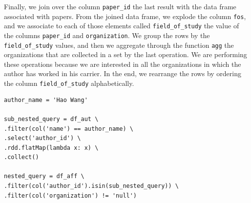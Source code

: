 \begin{enumerate}
    Finally, we join over the column \verb|paper_id| the last result with the data frame associated with papers.
    From the joined data frame, we explode the column \verb|fos|, and we associate to each of those elements called \verb|field_of_study| the value of the columns \verb|paper_id| and \verb|organization|.
    We group the rows by the \verb|field_of_study| values, and then we aggregate through the function \verb|agg| the organizations that are collected in a set by the last operation.
    We are performing these operations because we are interested in all the organizations in which the author has worked in his carrier.
    In the end, we rearrange the rows by ordering the column \verb|field_of_study| alphabetically.
    \begin{lstlisting}[label={lst:query8spark}]
author_name = 'Hao Wang'

sub_nested_query = df_aut \
.filter(col('name') == author_name) \
.select('author_id') \
.rdd.flatMap(lambda x: x) \
.collect()

nested_query = df_aff \
.filter(col('author_id').isin(sub_nested_query)) \
.filter(col('organization') != 'null')


\end{lstlisting}
\end{enumerate}
